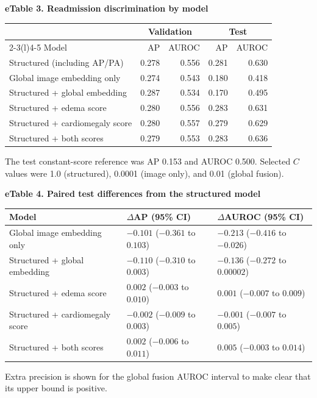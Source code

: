 \noindent\textbf{eTable 3. Readmission discrimination by model}\par
\begin{longtable}{@{}p{.43\linewidth}rrrr@{}}
\toprule
 & \multicolumn{2}{c}{Validation} & \multicolumn{2}{c}{Test} \\
\cmidrule(lr){2-3}\cmidrule(l){4-5}
Model & AP & AUROC & AP & AUROC \\
\midrule
\endhead
Structured (including AP/PA) & 0.278 & 0.556 & 0.281 & 0.630 \\
Global image embedding only & 0.274 & 0.543 & 0.180 & 0.418 \\
Structured + global embedding & 0.287 & 0.534 & 0.170 & 0.495 \\
Structured + edema score & 0.280 & 0.556 & 0.283 & 0.631 \\
Structured + cardiomegaly score & 0.280 & 0.557 & 0.279 & 0.629 \\
Structured + both scores & 0.279 & 0.553 & 0.283 & 0.636 \\
\bottomrule
\end{longtable}
\noindent The test constant-score reference was AP 0.153 and AUROC 0.500. Selected $C$ values were 1.0 (structured), 0.0001 (image only), and 0.01 (global fusion).
\medskip

\noindent\textbf{eTable 4. Paired test differences from the structured model}\par
\begin{longtable}{@{}p{.32\linewidth}ll@{}}
\toprule
Model & $\Delta$AP (95\% CI) & $\Delta$AUROC (95\% CI) \\
\midrule
\endhead
Global image embedding only & $-0.101$ ($-0.361$ to $0.103$) & $-0.213$ ($-0.416$ to $-0.026$) \\
Structured + global embedding & $-0.110$ ($-0.310$ to $0.003$) & $-0.136$ ($-0.272$ to $0.00002$) \\
Structured + edema score & $0.002$ ($-0.003$ to $0.010$) & $0.001$ ($-0.007$ to $0.009$) \\
Structured + cardiomegaly score & $-0.002$ ($-0.009$ to $0.003$) & $-0.001$ ($-0.007$ to $0.005$) \\
Structured + both scores & $0.002$ ($-0.006$ to $0.011$) & $0.005$ ($-0.003$ to $0.014$) \\
\bottomrule
\end{longtable}
\noindent Extra precision is shown for the global fusion AUROC interval to make clear that its upper bound is positive.
\medskip

